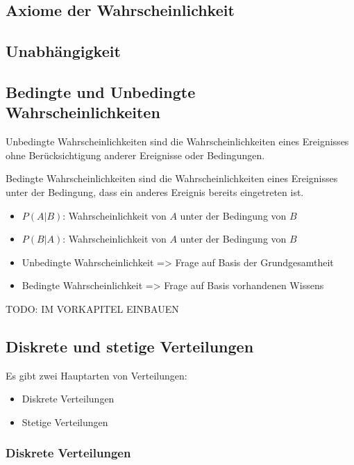 \documentclass[12pt]{scrartcl}
\begin{document}
\subsection{Axiome der Wahrscheinlichkeit}
\subsection{Unabhängigkeit}
\subsection{Bedingte und Unbedingte Wahrscheinlichkeiten}

Unbedingte Wahrscheinlichkeiten sind die Wahrscheinlichkeiten eines Ereignisses ohne
Berücksichtigung anderer Ereignisse oder Bedingungen. \par

Bedingte Wahrscheinlichkeiten sind die Wahrscheinlichkeiten eines Ereignisses unter der
Bedingung, dass ein anderes Ereignis bereits eingetreten ist.\par

\begin{itemize}
    \item $P(A|B)$: Wahrscheinlichkeit von $A$ unter der Bedingung von $B$
    \item $P(B|A)$: Wahrscheinlichkeit von $A$ unter der Bedingung von $B$
\end{itemize}

\begin{itemize}
    \item Unbedingte Wahrscheinlichkeit => Frage auf Basis der Grundgesamtheit
    \item Bedingte Wahrscheinlichkeit => Frage auf Basis vorhandenen Wissens
\end{itemize}

TODO: IM VORKAPITEL EINBAUEN

\pagebreak

\subsection{Diskrete und stetige Verteilungen}

Es gibt zwei Hauptarten von Verteilungen:
\begin{itemize}
    \item Diskrete Verteilungen
    \item Stetige Verteilungen
\end{itemize}

\subsubsection{Diskrete Verteilungen}
\end{document}
